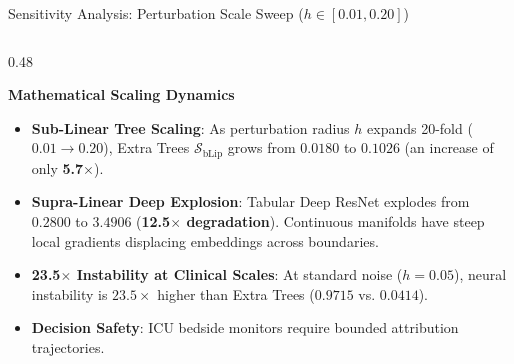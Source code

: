 \documentclass[aspectratio=169,10pt]{beamer}
\begin{document}
\begin{frame}{Sensitivity Analysis: Perturbation Scale Sweep ($h \in [0.01, 0.20]$)}
\begin{columns}[t]
\begin{column}{0.48\textwidth}
\begin{exampleblock}{\textbf{Mathematical Scaling Dynamics}}
        \scriptsize
        \begin{itemize}\setlength\itemsep{2.5pt}
          \item \textbf{Sub-Linear Tree Scaling}:
          As perturbation radius $h$ expands 20-fold ($0.01 \to 0.20$), Extra Trees $\mathcal{S}_{\text{bLip}}$ grows from $0.0180$ to $0.1026$ (an increase of only \textbf{5.7$\times$}).
          \item \textbf{Supra-Linear Deep Explosion}:
          Tabular Deep ResNet explodes from $0.2800$ to $3.4906$ (\textbf{12.5$\times$ degradation}). Continuous manifolds have steep local gradients displacing embeddings across boundaries.
          \item \textbf{23.5$\times$ Instability at Clinical Scales}:
          At standard noise ($h = 0.05$), neural instability is $23.5\times$ higher than Extra Trees ($0.9715$ vs. $0.0414$).
          \item \textbf{Decision Safety}: ICU bedside monitors require bounded attribution trajectories.
        \end{itemize}
      \end{exampleblock}
    \end{column}
  \end{columns}
\end{frame}
\end{document}
